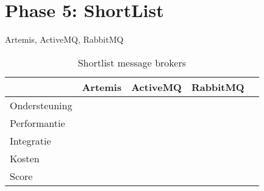 \section{Phase 5: ShortList}

Artemis, ActiveMQ, RabbitMQ
\begin{table}[h!]
  \footnotesize
  \centering
  \begin{tabular}{|l|c|c|c|c|}
  \hline
  & Artemis & ActiveMQ & RabbitMQ \\
  \hline
  Ondersteuning &  &  &  \\
  \hline
  Performantie &  &  &  \\
  \hline
  Integratie &  &  &  \\ 
  \hline
  Kosten &   &  &  \\
  \hline
  Score &   &  &  \\
  \hline
    
  \end{tabular}
  \caption{\label{tab:message_brokers_short}Shortlist message brokers}
  \end{table}








